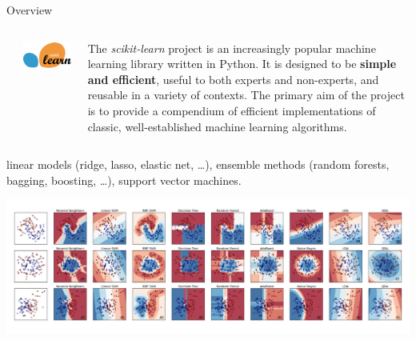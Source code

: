 \documentclass[final]{beamer}
\newcommand{\sklearn}{\textit{scikit-learn}\xspace}
\begin{document}
\begin{frame}[fragile]
\begin{textblock}{0.32}
\begin{block}{Overview \phantom{p}}
\begin{columns}
\begin{column}{0.01\textwidth}
\end{column}
\begin{column}{0.3\textwidth}
\begin{center}
\includegraphics[width=\textwidth]{sklearn-logo}
\end{center}
\end{column}
\begin{column}{0.69\textwidth}
The \sklearn project is an increasingly
popular machine learning library written in Python. It is designed to be
\textbf{simple and efficient}, useful to both experts and non-experts, and
reusable in a variety of contexts. The
primary aim of the project is to provide a compendium of
efficient implementations of classic, well-established machine learning
algorithms.
\end{column}
\end{columns}

\vspace{0.3cm}

\textbf{} linear models
(ridge, lasso, elastic net, \ldots), ensemble methods
(random forests, bagging, boosting, \ldots), support vector machines.


\begin{center}
\includegraphics[width=\textwidth]{comparison}
\end{center}


\end{block}
\end{textblock}
\end{frame}
\end{document}
